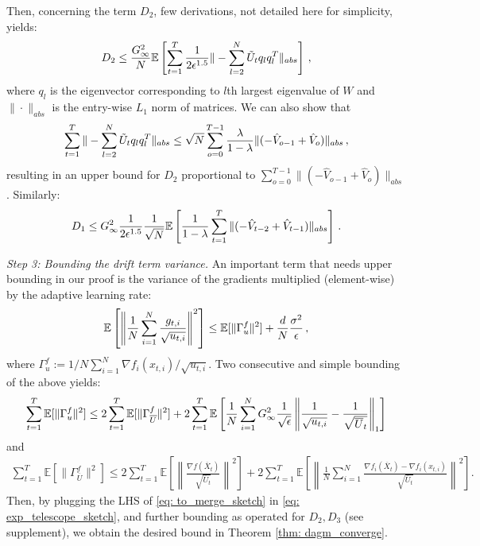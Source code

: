\documentclass{article} %
\begin{document}
 
 Then, concerning the term $D_2$, few derivations, not detailed here for simplicity, yields:
 \begin{align}\notag
 D_2 \leq \frac{G_{\infty}^2}{N} \mathbb E \left[\sum_{t=1}^T \frac{1}{2\epsilon^{1.5}}  \| - \sum_{l=2}^N  \tilde U_t q_l q_l^T \|_{abs} \right] \, ,
 \end{align}
 where $q_l$ is the eigenvector corresponding to $l$th largest eigenvalue of $W$ and $\|\cdot\|_{abs}$ is the entry-wise $L_1$ norm of  matrices.
 We can also show that 
 \begin{align}\notag
 \sum_{t=1}^T  \| - \sum_{l=2}^N  \tilde U_t q_l q_l^T \|_{abs}  \leq {\sqrt{N}} \sum_{o=0}^{T-1} \frac{\lambda}{1-\lambda}     \|    (- \hat V_{o-1} + \hat V_{o} ) \|_{abs} \, ,
 \end{align}
 resulting in an upper bound for $D_2$ proportional to $\sum_{o=0}^{T-1}  \|    (- \hat V_{o-1} + \hat V_{o} ) \|_{abs} $. 
 Similarly:
 \begin{align}\notag
 D_1 \leq G_{\infty}^2 \frac{1}{2\epsilon^{1.5}} \frac{1}{\sqrt{N}}   \mathbb E \left [  \frac{1}{1-\lambda}   \sum_{t=1}^T  \| ( - \hat V_{t-2} + \hat V_{t-1}) \|_{abs}   \right]\, .
 \end{align}


\textsl{Step 3: Bounding the drift term variance.}\hspace{0.01in} An important term that needs upper bounding in our proof is the variance of the gradients multiplied (element-wise) by the adaptive learning rate:
 \begin{align}\notag
 \mathbb E\left[ \left\| \frac{1}{N} \sum_{i=1}^N \frac{g_{t,i}}{\sqrt{u_{t,i}}} \right\|^2 \right]  \leq   \mathbb E [\| \Gamma_{u}^f\|^2 ] + \frac{d}{N}  
 \frac{ \sigma^2 }{\epsilon} \, ,
 \end{align}
 where $ \Gamma_{u}^f := 1/N \sum_{i=1}^N \nabla f_i(x_{t,i})/\sqrt{u_{t,i}} $. Two consecutive and simple bounding of the above yields:
 \begin{align}\notag
 \sum_{t=1}^T \mathbb E [  \|\Gamma_{u}^f\|^2 ]  
  \leq  2\sum_{t=1}^T \mathbb E [\|\Gamma_{\overline{U}}^f \|^2] + 2 \sum_{t=1}^T \mathbb E \left[  \frac{1}{N} \sum_{i=1}^N G_{\infty}^2  \frac{1}{\sqrt{\epsilon}}\left\|     \frac{1}{\sqrt{u_{t,i}}} - \frac{1}{\sqrt{\overline U_{t}}}  \right\|_1     \right]
 \end{align}
 and
 \begin{align}\label{eq: to_merge_sketch}
 \sum_{t=1}^T \mathbb E [\|\Gamma_{\overline{U}}^f \|^2]  
 \leq  2 \sum_{t=1}^T \mathbb E \left[  \left\| \frac{\nabla f(\overline X_{t})}{\sqrt{\overline U_t}  } \right\|^2 \right] 
+ 2 \sum_{t=1}^T \mathbb E \left[  \left\|\frac{1}{N} \sum_{i=1}^N \frac{\nabla f_i(\overline X_t) - \nabla f_i(x_{t,i})}{\sqrt{\overline U_t}  } \right\|^2 \right].
 \end{align}
Then, by plugging the LHS of \eqref{eq: to_merge_sketch} in \eqref{eq: exp_telescope_sketch}, and further bounding as operated for $D_2, D_3$ (see supplement), we obtain the desired bound in Theorem \ref{thm: dagm_converge}.
\end{document}

